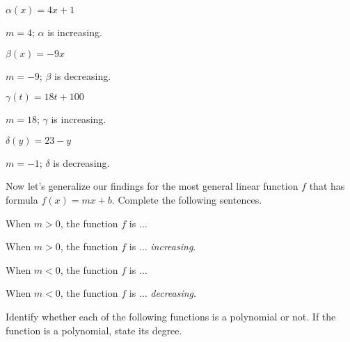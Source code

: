 \begin{exercises}
\begin{problem}
\begin{multicols}{4}
 	\begin{subproblem}
 		$\alpha(x)=4x+1$ 
 		\begin{shortsolution}
 			$m=4$; $\alpha$ is increasing. 
 		\end{shortsolution}
 	\end{subproblem}
 	\begin{subproblem}
 		$\beta(x)=-9x$ 
 		\begin{shortsolution}
 			$m=-9$; $\beta$ is decreasing. 
 		\end{shortsolution}
 	\end{subproblem}
 	\begin{subproblem}
 		$\gamma(t)=18t+100$ 
 		\begin{shortsolution}
 			$m=18$; $\gamma$ is increasing.
 		\end{shortsolution}
 	\end{subproblem}
 	\begin{subproblem}
 		$\delta(y)=23-y$ 
 		\begin{shortsolution}
 			$m=-1$; $\delta$ is decreasing. 
 		\end{shortsolution}
 	\end{subproblem}
 \end{multicols}
 Now let's generalize our findings for the most general linear function $f$
 that has formula $f(x)=mx+b$. Complete the following sentences.
 \begin{subproblem}
 	When $m>0$, the function $f$ is $\ldots$  
 	\begin{shortsolution}
 		When $m>0$, the function $f$ is $\ldots$  \emph{increasing}.
 	\end{shortsolution}
 \end{subproblem}
 \begin{subproblem}
 	When $m<0$, the function $f$ is $\ldots$  
 	\begin{shortsolution}
 		When $m<0$, the function $f$ is $\ldots$  \emph{decreasing}.
 	\end{shortsolution}
 \end{subproblem}
 \end{problem}
 \begin{problem}
 Identify whether each of the following functions is a polynomial or not. 
 If the function is a polynomial, state its degree.
 \begin{multicols}{3}
 	\begin{subproblem}

\end{subproblem}
\end{multicols}
\end{problem}
\end{exercises}
